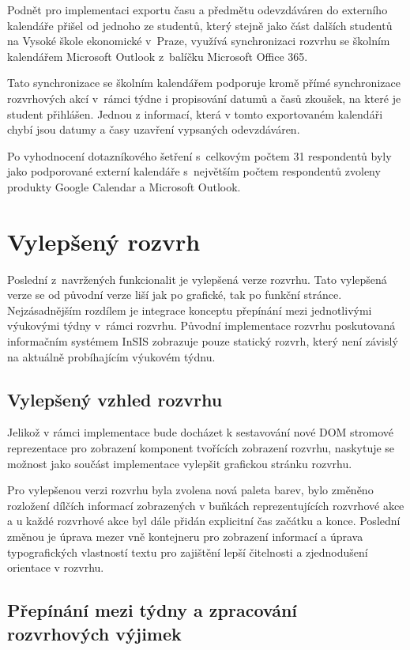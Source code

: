 Podnět pro implementaci exportu času a předmětu odevzdáváren do externího kalendáře přišel od jednoho ze studentů, který stejně jako část dalších studentů na Vysoké škole ekonomické v~Praze, využívá synchronizaci rozvrhu se školním kalendářem Microsoft Outlook z~balíčku Microsoft Office 365.

Tato synchronizace se školním kalendářem podporuje kromě přímé synchronizace rozvrhových akcí v~rámci týdne i propisování datumů a časů zkoušek, na které je student přihlášen. Jednou z informací, která v tomto exportovaném kalendáři chybí jsou datumy a časy uzavření vypsaných odevzdáváren.

Po vyhodnocení dotazníkového šetření s~celkovým počtem 31 respondentů byly jako podporované externí kalendáře s~největším počtem respondentů zvoleny produkty Google Calendar a Microsoft Outlook.

\section{Vylepšený rozvrh}\label{sec:vylepseny-rozvrh}

Poslední z~navržených funkcionalit je vylepšená verze rozvrhu. Tato vylepšená verze se od původní verze liší jak po grafické, tak po funkční stránce. Nejzásadnějším rozdílem je integrace konceptu přepínání mezi jednotlivými výukovými týdny v~rámci rozvrhu. Původní implementace rozvrhu poskutovaná informačním systémem InSIS zobrazuje pouze statický rozvrh, který není závislý na aktuálně probíhajícím výukovém týdnu.

\subsection{Vylepšený vzhled rozvrhu}

Jelikož v rámci implementace bude docházet k sestavování nové DOM stromové reprezentace pro zobrazení komponent tvořících zobrazení rozvrhu, naskytuje se možnost jako součást  implementace vylepšit grafickou stránku rozvrhu. 

Pro vylepšenou verzi rozvrhu byla zvolena nová paleta barev, bylo změněno rozložení dílčích informací zobrazených v buňkách reprezentujících rozvrhové akce a u každé rozvrhové akce byl dále přidán explicitní čas začátku a konce. Poslední změnou je úprava mezer vně kontejneru pro zobrazení informací a úprava typografických vlastností textu pro zajištění lepší čitelnosti a zjednodušení orientace v rozvrhu.

\subsection{Přepínání mezi týdny a zpracování rozvrhových výjimek}

